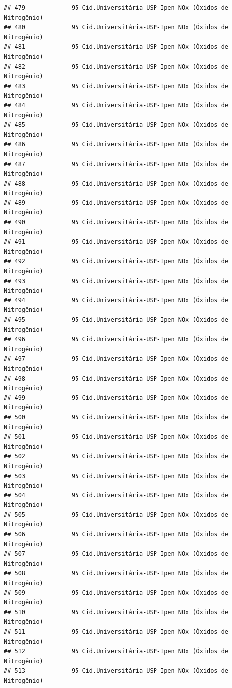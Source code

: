 \documentclass[]{book}
\begin{document}
\begin{verbatim}
## 479             95 Cid.Universitária-USP-Ipen NOx (Óxidos de Nitrogênio)
## 480             95 Cid.Universitária-USP-Ipen NOx (Óxidos de Nitrogênio)
## 481             95 Cid.Universitária-USP-Ipen NOx (Óxidos de Nitrogênio)
## 482             95 Cid.Universitária-USP-Ipen NOx (Óxidos de Nitrogênio)
## 483             95 Cid.Universitária-USP-Ipen NOx (Óxidos de Nitrogênio)
## 484             95 Cid.Universitária-USP-Ipen NOx (Óxidos de Nitrogênio)
## 485             95 Cid.Universitária-USP-Ipen NOx (Óxidos de Nitrogênio)
## 486             95 Cid.Universitária-USP-Ipen NOx (Óxidos de Nitrogênio)
## 487             95 Cid.Universitária-USP-Ipen NOx (Óxidos de Nitrogênio)
## 488             95 Cid.Universitária-USP-Ipen NOx (Óxidos de Nitrogênio)
## 489             95 Cid.Universitária-USP-Ipen NOx (Óxidos de Nitrogênio)
## 490             95 Cid.Universitária-USP-Ipen NOx (Óxidos de Nitrogênio)
## 491             95 Cid.Universitária-USP-Ipen NOx (Óxidos de Nitrogênio)
## 492             95 Cid.Universitária-USP-Ipen NOx (Óxidos de Nitrogênio)
## 493             95 Cid.Universitária-USP-Ipen NOx (Óxidos de Nitrogênio)
## 494             95 Cid.Universitária-USP-Ipen NOx (Óxidos de Nitrogênio)
## 495             95 Cid.Universitária-USP-Ipen NOx (Óxidos de Nitrogênio)
## 496             95 Cid.Universitária-USP-Ipen NOx (Óxidos de Nitrogênio)
## 497             95 Cid.Universitária-USP-Ipen NOx (Óxidos de Nitrogênio)
## 498             95 Cid.Universitária-USP-Ipen NOx (Óxidos de Nitrogênio)
## 499             95 Cid.Universitária-USP-Ipen NOx (Óxidos de Nitrogênio)
## 500             95 Cid.Universitária-USP-Ipen NOx (Óxidos de Nitrogênio)
## 501             95 Cid.Universitária-USP-Ipen NOx (Óxidos de Nitrogênio)
## 502             95 Cid.Universitária-USP-Ipen NOx (Óxidos de Nitrogênio)
## 503             95 Cid.Universitária-USP-Ipen NOx (Óxidos de Nitrogênio)
## 504             95 Cid.Universitária-USP-Ipen NOx (Óxidos de Nitrogênio)
## 505             95 Cid.Universitária-USP-Ipen NOx (Óxidos de Nitrogênio)
## 506             95 Cid.Universitária-USP-Ipen NOx (Óxidos de Nitrogênio)
## 507             95 Cid.Universitária-USP-Ipen NOx (Óxidos de Nitrogênio)
## 508             95 Cid.Universitária-USP-Ipen NOx (Óxidos de Nitrogênio)
## 509             95 Cid.Universitária-USP-Ipen NOx (Óxidos de Nitrogênio)
## 510             95 Cid.Universitária-USP-Ipen NOx (Óxidos de Nitrogênio)
## 511             95 Cid.Universitária-USP-Ipen NOx (Óxidos de Nitrogênio)
## 512             95 Cid.Universitária-USP-Ipen NOx (Óxidos de Nitrogênio)
## 513             95 Cid.Universitária-USP-Ipen NOx (Óxidos de Nitrogênio)

\end{verbatim}
\end{document}
